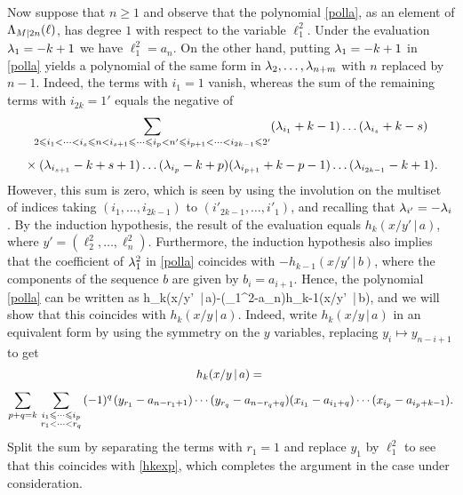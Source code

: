 \documentclass[12pt]{article}
\begin{document}
Now suppose that $n\geqslant 1$ and observe that
the polynomial \eqref{polla}, as an element of $\Lambda_{M|2n}(\ell)$,
has degree $1$ with respect to the variable
$\ell_1^2$.
Under the evaluation $\lambda_1=-k+1$ we have $\ell_1^2=a_n$. On the other hand,
putting $\lambda_1=-k+1$
in \eqref{polla} yields a polynomial of the same form in $\lambda_2,\dots,\lambda_{n+m}$
with $n$ replaced by $n-1$.
Indeed, the terms with $i_{1}=1$ vanish, whereas the sum of the remaining terms with $i_{2k}=1'$
equals the negative of
\begin{multline}\nonumber
\sum_{2\leqslant i_1<\dots<i_s\leqslant n<i_{s+1}\leqslant\dots\leqslant i_p<n'
\leqslant i_{p+1}<\dots<i_{2k-1}\leqslant 2'}
(\lambda_{i_1}+k-1)\dots(\lambda_{i_s}+k-s)\\[0.4em]
{}\times (\lambda_{i_{s+1}}-k+s+1)\dots
(\lambda_{i_{p}}-k+p)(\lambda_{i_{p+1}}+k-p-1)\dots (\lambda_{i_{2k-1}}-k+1).
\end{multline}
However, this sum is zero, which is seen by using the involution on the multiset of indices
taking
$(i_1,\dots,i_{2k-1})$ to $(i'_{2k-1},\dots,i'_{1})$, and recalling that $\lambda_{i'}=-\lambda_i$.
By the induction hypothesis, the result of the evaluation
equals $h_k(x/y'\, |\,a)$, where $y'=(\ell_2^2,\dots,\ell_n^2)$.
Furthermore, the induction hypothesis also implies that
the coefficient of $\lambda^2_1$ in \eqref{polla} coincides with $-h_{k-1}(x/y'\, |\,b)$,
where the components of the sequence $b$ are given by $b_i=a_{i+1}$.
Hence, the polynomial \eqref{polla} can be written as
h_k(x/y'\, |\,a)-(\ell_1^2-a_n)\tss h_{k-1}(x/y'\, |\,b),
\eeq
and we will show that this
coincides with $h_k(x/y\, |\,a)$. Indeed, write
$h_k(x/y\, |\,a)$ in an equivalent form by using the symmetry on the $y$ variables,
replacing $y_i\mapsto y_{n-i+1}$ to get
\begin{multline}
h_k(x/y\, |\,a)={}\\[0.4em]
 \sum_{p+q=k}\sum_{\begin{smallmatrix}i_1\leqslant \dots \leqslant i_p \\ r_1<\cdots < r_q\end{smallmatrix}} (-1)^q\hspace{1pt}(y_{r_1}- a_{n-r_1+1}) \cdots (y_{r_q} - a_{n-r_q + q}) (x_{i_1} - a_{i_1+q}) \cdots (x_{i_p} - a_{i_p+k-1}).
\nonumber
\end{multline}
Split the sum by separating the terms with $r_1=1$ and replace $y_1$ by $\ell_1^2$ to see that
this coincides with \eqref{hkexp}, which completes the argument in the case under consideration.
\end{document}
